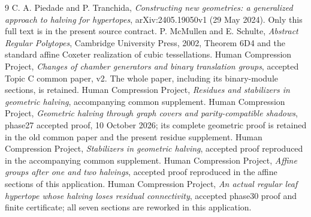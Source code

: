 \begin{thebibliography}{9}
 C. A. Piedade and P. Tranchida, \emph{Constructing new geometries: a generalized approach to halving for hypertopes}, arXiv:2405.19050v1 (29 May 2024). Only this full text is in the present source contract.
 P. McMullen and E. Schulte, \emph{Abstract Regular Polytopes}, Cambridge University Press, 2002, Theorem 6D4 and the standard affine Coxeter realization of cubic tessellations.
 Human Compression Project, \emph{Changes of chamber generators and binary translation groups}, accepted Topic C common paper, v2. The whole paper, including its binary-module sections, is retained.
 Human Compression Project, \emph{Residues and stabilizers in geometric halving}, accompanying common supplement.
 Human Compression Project, \emph{Geometric halving through graph covers and parity-compatible shadows}, phase27 accepted proof, 10 October 2026; its complete geometric proof is retained in the old common paper and the present residue supplement.
 Human Compression Project, \emph{Stabilizers in geometric halving}, accepted proof reproduced in the accompanying common supplement.
 Human Compression Project, \emph{Affine groups after one and two halvings}, accepted proof reproduced in the affine sections of this application.
 Human Compression Project, \emph{An actual regular leaf hypertope whose halving loses residual connectivity}, accepted phase30 proof and finite certificate; all seven sections are reworked in this application.
\end{thebibliography}
